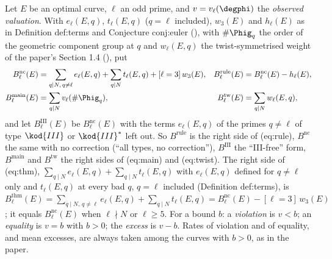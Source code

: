 \begin{sloppypar}
\begin{convention}\label{conv:computation:bounds}
Let $E$ be an optimal curve, $\ell$ an odd prime, and $v=v_\ell(\degphi)$ the \emph{observed valuation}. With $e_\ell(E,q)$, $t_\ell(E,q)$
($q=\ell$ included), $w_3(E)$ and $h_\ell(E)$ as in Definition def:terms and Conjecture conj:euler (), with $\#\Phig_q$
the order of the geometric component group at $q$ and $w_\ell(E,q)$ the twist-symmetrised weight of the paper's Section 1.4 (),
put
\begin{align*}
B^{\mathrm{nc}}_\ell(E)&=\sum_{q\mid N,\,q\ne\ell}e_\ell(E,q)+\sum_{q\mid N}t_\ell(E,q)+[\ell=3]\,w_3(E), &
B^{\mathrm{rule}}_\ell(E)&=B^{\mathrm{nc}}_\ell(E)-h_\ell(E),\\
B^{\mathrm{main}}_\ell(E)&=\sum_{q\mid N}v_\ell(\#\Phig_q), &
B^{\mathrm{tw}}_\ell(E)&=\sum_{q\mid N}w_\ell(E,q),
\end{align*}
and let $B^{\mathrm{III}}_\ell(E)$ be $B^{\mathrm{nc}}_\ell(E)$ with the terms $e_\ell(E,q)$ of the primes $q\ne\ell$ of type $\kod{III}$ or $\kod{III}^*$ left out.
So $B^{\mathrm{rule}}$ is the right side of (eq:rule), $B^{\mathrm{nc}}$ the same with no correction (``all types, no correction''), $B^{\mathrm{III}}$ the
``III-free'' form, $B^{\mathrm{main}}$ and $B^{\mathrm{tw}}$ the right sides of (eq:main) and (eq:twist). The right side of (eq:thm), $\sum_{q\mid N}e_\ell(E,q)+\sum_{q\mid N}t_\ell(E,q)$ with $e_\ell(E,q)$ defined for $q\ne\ell$ only and $t_\ell(E,q)$ at every bad $q$,
$q=\ell$ included (Definition def:terms), is
$B^{\mathrm{thm}}_\ell(E)=\sum_{q\mid N,\,q\ne\ell}e_\ell(E,q)+\sum_{q\mid N}t_\ell(E,q)=B^{\mathrm{nc}}_\ell(E)-[\ell=3]\,w_3(E)$; it equals $B^{\mathrm{nc}}_\ell(E)$ when $\ell\nmid N$
or $\ell\ge5$. For a bound $b$: a \emph{violation} is $v<b$; an \emph{equality} is $v=b$ with $b>0$; the \emph{excess} is $v-b$. Rates of
violation and of equality, and mean excesses, are always taken among the curves with $b>0$, as in the paper.
\end{convention}


\end{sloppypar}
